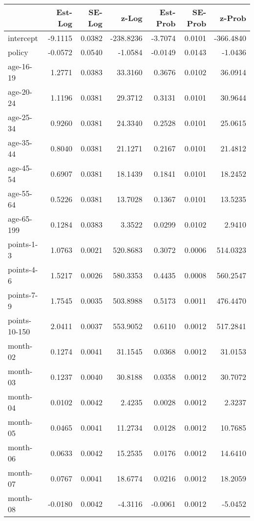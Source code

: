 \documentclass[10pt]{article}
\begin{document}

\begin{table}[ht]
\centering
\begin{tabular}{lrrrrrr}
  \hline
 & Est-Log & SE-Log & z-Log & Est-Prob & SE-Prob & z-Prob \\ 
  \hline
intercept & -9.1115 & 0.0382 & -238.8236 & -3.7074 & 0.0101 & -366.4840 \\ 
  policy & -0.0572 & 0.0540 & -1.0584 & -0.0149 & 0.0143 & -1.0436 \\ 
  age-16-19 & 1.2771 & 0.0383 & 33.3160 & 0.3676 & 0.0102 & 36.0914 \\ 
  age-20-24 & 1.1196 & 0.0381 & 29.3712 & 0.3131 & 0.0101 & 30.9644 \\ 
  age-25-34 & 0.9260 & 0.0381 & 24.3340 & 0.2528 & 0.0101 & 25.0615 \\ 
  age-35-44 & 0.8040 & 0.0381 & 21.1271 & 0.2167 & 0.0101 & 21.4812 \\ 
  age-45-54 & 0.6907 & 0.0381 & 18.1439 & 0.1841 & 0.0101 & 18.2452 \\ 
  age-55-64 & 0.5226 & 0.0381 & 13.7028 & 0.1367 & 0.0101 & 13.5235 \\ 
  age-65-199 & 0.1284 & 0.0383 & 3.3522 & 0.0299 & 0.0102 & 2.9410 \\ 
  points-1-3 & 1.0763 & 0.0021 & 520.8683 & 0.3072 & 0.0006 & 514.0323 \\ 
  points-4-6 & 1.5217 & 0.0026 & 580.3353 & 0.4435 & 0.0008 & 560.2547 \\ 
  points-7-9 & 1.7545 & 0.0035 & 503.8988 & 0.5173 & 0.0011 & 476.4470 \\ 
  points-10-150 & 2.0411 & 0.0037 & 553.9052 & 0.6110 & 0.0012 & 517.2841 \\ 
  month-02 & 0.1274 & 0.0041 & 31.1545 & 0.0368 & 0.0012 & 31.0153 \\ 
  month-03 & 0.1237 & 0.0040 & 30.8188 & 0.0358 & 0.0012 & 30.7072 \\ 
  month-04 & 0.0102 & 0.0042 & 2.4235 & 0.0028 & 0.0012 & 2.3237 \\ 
  month-05 & 0.0465 & 0.0041 & 11.2734 & 0.0128 & 0.0012 & 10.7685 \\ 
  month-06 & 0.0633 & 0.0042 & 15.2535 & 0.0176 & 0.0012 & 14.6410 \\ 
  month-07 & 0.0767 & 0.0041 & 18.6774 & 0.0216 & 0.0012 & 18.2059 \\ 
  month-08 & -0.0180 & 0.0042 & -4.3116 & -0.0061 & 0.0012 & -5.0452 \\ 

\end{tabular}
\end{table}
\end{document}
